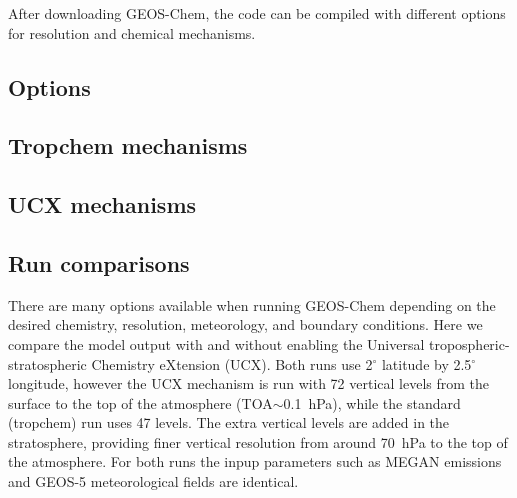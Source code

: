       After downloading GEOS-Chem, the code can be compiled with different options for resolution and chemical mechanisms.
  \subsection{Options}
    
  \subsection{Tropchem mechanisms}
    
  \subsection{UCX mechanisms}
    
  \subsection{Run comparisons}
    
    There are many options available when running GEOS-Chem depending on the desired chemistry, resolution, meteorology, and boundary conditions.
    Here we compare the model output with and without enabling the Universal tropospheric-stratospheric Chemistry eXtension (UCX).
    Both runs use 2$^{\circ}$ latitude by 2.5$^{\circ}$ longitude, however the UCX mechanism is run with 72 vertical levels from the surface to the top of the atmosphere (TOA$\sim$0.1~hPa), while the standard (tropchem) run uses 47 levels.
    The extra vertical levels are added in the stratosphere, providing finer vertical resolution from around 70~hPa to the top of the atmosphere.
    For both runs the inpup parameters such as MEGAN emissions and GEOS-5 meteorological fields are identical.
    
